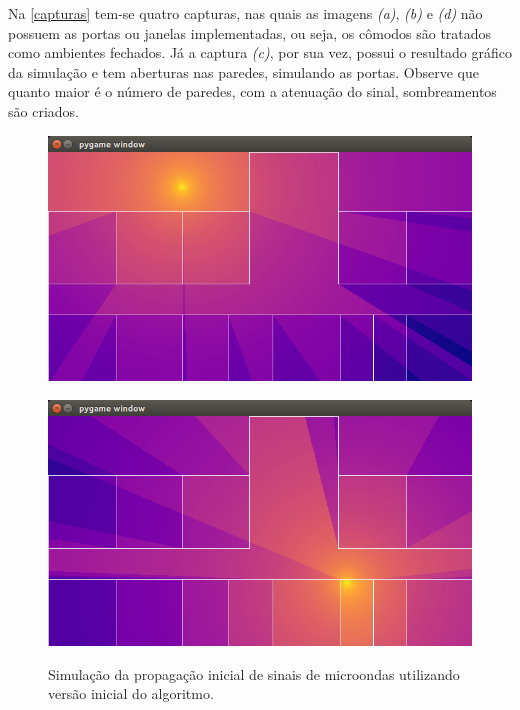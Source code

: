 \documentclass[
	12pt,				%
	twoside,			%
	a4paper,			%
	english,			%
	french,				%
	spanish,			%
	brazil				%
	]{abntex2}
\begin{document}
Na \autoref{capturas} tem-se quatro capturas, nas quais as imagens
\emph{(a)}, \emph{(b)} e \emph{(d)} não possuem as portas ou janelas
implementadas, ou seja, os cômodos são tratados como ambientes fechados.
Já a captura \emph{(c)}, por sua vez, possui o resultado gráfico da
simulação e tem aberturas nas paredes, simulando as portas. Observe que
quanto maior é o número de paredes, com a atenuação do sinal,
sombreamentos são criados.

\begin{figure}[htb]
    
    \caption{\label{capturas} Simulação da propagação inicial de sinais de microondas utilizando versão inicial do algoritmo.}
    \centering
    \begin{minipage}{0.4\textwidth}
        \centering \label{captura_1}
        \includegraphics[scale=0.28]{imagens/captura-1.jpg}
    \end{minipage}
    \hfill
    \begin{minipage}{0.4\textwidth}
        \centering \label{captura_2}
        \includegraphics[scale=0.28]{imagens/captura-2.jpg}

\end{minipage}
\end{figure}
\end{document}
